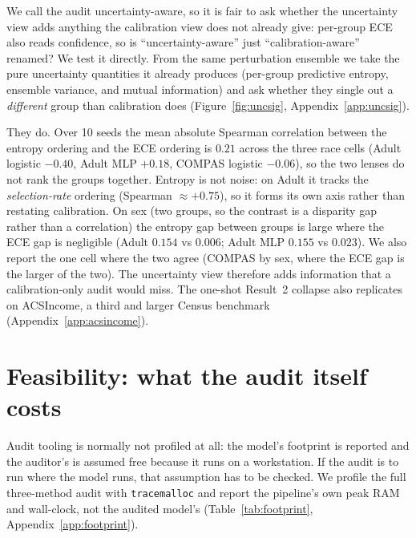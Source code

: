\documentclass{article}
\begin{document}
We call the audit uncertainty-aware, so it is fair to ask whether the uncertainty view adds anything the calibration view does not already give: per-group ECE also reads confidence, so is ``uncertainty-aware'' just ``calibration-aware'' renamed? We test it directly. From the same perturbation ensemble we take the pure uncertainty quantities it already produces (per-group predictive entropy, ensemble variance, and mutual information) and ask whether they single out a \emph{different} group than calibration does (Figure~\ref{fig:uncsig}, Appendix~\ref{app:uncsig}).

They do. Over 10 seeds the mean absolute Spearman correlation between the entropy ordering and the ECE ordering is $0.21$ across the three race cells (Adult logistic $-0.40$, Adult MLP $+0.18$, COMPAS logistic $-0.06$), so the two lenses do not rank the groups together. Entropy is not noise: on Adult it tracks the \emph{selection-rate} ordering (Spearman $\approx +0.75$), so it forms its own axis rather than restating calibration. On sex (two groups, so the contrast is a disparity gap rather than a correlation) the entropy gap between groups is large where the ECE gap is negligible (Adult $0.154$ vs $0.006$; Adult MLP $0.155$ vs $0.023$). We also report the one cell where the two agree (COMPAS by sex, where the ECE gap is the larger of the two). The uncertainty view therefore adds information that a calibration-only audit would miss. The one-shot Result~2 collapse also replicates on ACSIncome, a third and larger Census benchmark (Appendix~\ref{app:acsincome}).

\section{Feasibility: what the audit itself costs}
\label{sec:feasibility}

Audit tooling is normally not profiled at all: the model's footprint is reported and the auditor's is assumed free because it runs on a workstation. If the audit is to run where the model runs, that assumption has to be checked. We profile the full three-method audit with \texttt{tracemalloc} and report the pipeline's own peak RAM and wall-clock, not the audited model's (Table~\ref{tab:footprint}, Appendix~\ref{app:footprint}).
\end{document}
